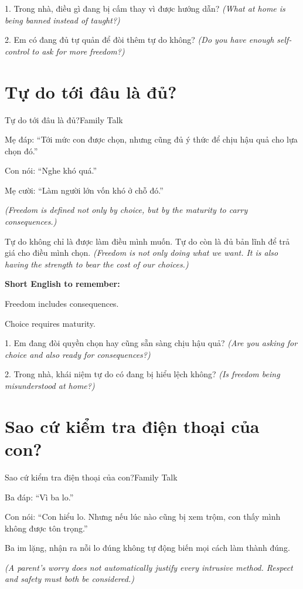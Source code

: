\begin{tuhocnhanh}
1. Trong nhà, điều gì đang bị cấm thay vì được hướng dẫn? \textit{(What at home is being banned instead of taught?)}

2. Em có đang đủ tự quản để đòi thêm tự do không? \textit{(Do you have enough self-control to ask for more freedom?)}
\end{tuhocnhanh}
\ngancach

\section{Tự do tới đâu là đủ?}
\begin{truyen}{Tự do tới đâu là đủ?}{Family Talk}

Mẹ đáp: ``Tới mức con được chọn, nhưng cũng đủ ý thức để chịu hậu quả cho lựa chọn đó.''

Con nói: ``Nghe khó quá.''

Mẹ cười: ``Làm người lớn vốn khó ở chỗ đó.''

\textit{(Freedom is defined not only by choice, but by the maturity to carry consequences.)}
\end{truyen}

\begin{baihoc}
Tự do không chỉ là được làm điều mình muốn. Tự do còn là đủ bản lĩnh để trả giá cho điều mình chọn.
\textit{(Freedom is not only doing what we want. It is also having the strength to bear the cost of our choices.)}
\end{baihoc}

\begin{ghinhoanh}
\textbf{Short English to remember:}

Freedom includes consequences.

Choice requires maturity.
\end{ghinhoanh}

\begin{tuhocnhanh}
1. Em đang đòi quyền chọn hay cũng sẵn sàng chịu hậu quả? \textit{(Are you asking for choice and also ready for consequences?)}

2. Trong nhà, khái niệm tự do có đang bị hiểu lệch không? \textit{(Is freedom being misunderstood at home?)}
\end{tuhocnhanh}
\ngancach

\section{Sao cứ kiểm tra điện thoại của con?}
\begin{truyen}{Sao cứ kiểm tra điện thoại của con?}{Family Talk}

Ba đáp: ``Vì ba lo.''

Con nói: ``Con hiểu lo. Nhưng nếu lúc nào cũng bị xem trộm, con thấy mình không được tôn trọng.''

Ba im lặng, nhận ra nỗi lo đúng không tự động biến mọi cách làm thành đúng.

\textit{(A parent's worry does not automatically justify every intrusive method. Respect and safety must both be considered.)}
\end{truyen}

